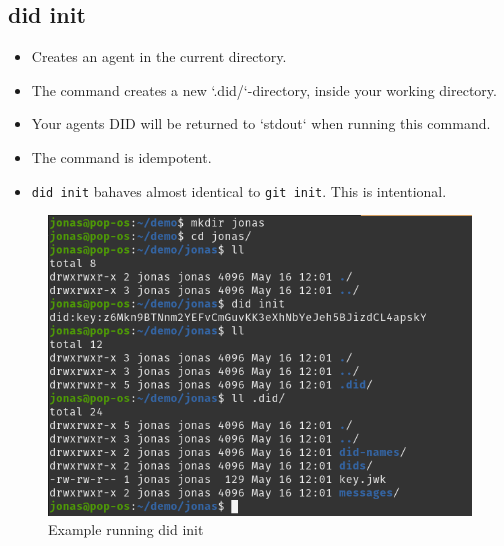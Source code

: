     
    
\subsection{did init}
\begin{itemize}
\item Creates an agent in the current directory.
\item The command creates a new `.did/`-directory, inside your working directory.
\item Your agents DID will be returned to `stdout` when running this command.
\item The command is idempotent.
\item \texttt{did init} bahaves almost identical to \texttt{git init}. This is intentional.
\end{itemize}
    \begin{figure}[htbp]
      \centering
      \includegraphics[width=.7\textwidth]{figures/cmd-init.png}
      \caption[]{Example running did init}
    \end{figure}
    



